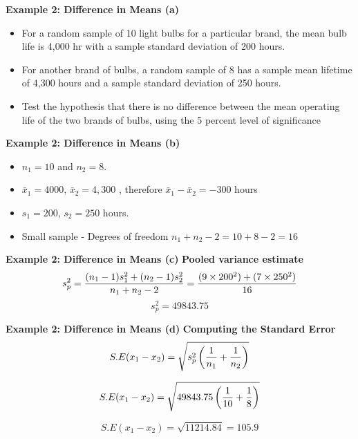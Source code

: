 \documentclass[a4]{beamer}
\begin{document}

\noindent \textbf{Example 2: Difference in Means (a) }
\begin{itemize}
\item For a random sample of 10 light bulbs for a particular brand, the mean bulb life is 4,000 hr with a sample standard deviation of 200 hours.
\item For another brand of bulbs, a random sample of 8 has a sample mean lifetime of 4,300 hours
and a sample standard deviation of 250 hours. \item Test the hypothesis that there is no difference between the
mean operating life of the two brands of bulbs, using the 5 percent level of significance
\end{itemize}




\noindent \textbf{Example 2: Difference in Means (b) }
\begin{itemize}\item $n_1 = 10$ and $n_2 = 8$.
\item $\bar{x}_1 = 4000$, $\bar{x}_2 = 4,300 $ , therefore  $\bar{x}_1 - \bar{x}_2 = -300$ hours
\item $s_1  = 200$, $s_2 = 250$ hours.
\item Small sample - Degrees of freedom $n_1 + n_2 - 2 = 10 + 8 - 2 = 16$
\end{itemize}

\noindent \textbf{Example 2: Difference in Means (c) }
\textbf{Pooled variance estimate}
\[ s^2_p = {(n_1 - 1)s^2_1  + (n_2 - 1)s^2_ 2\over n_1 + n_2 - 2 } = {(9 \times 200^2 ) +( 7 \times 250^2) \over 16 }  \]
\[ s^2_p  = 49843.75 \]



\noindent \textbf{Example 2: Difference in Means (d) }
\textbf{Computing the Standard Error}
\[ S.E(x_1 - x_2) = \sqrt{s^2_p \left({1\over n_1}+{1\over n_2} \right)}\]

\[ S.E(x_1 - x_2) = \sqrt{49843.75 \left({1\over 10}+{1\over 8} \right)}\]

\[ S.E(x_1 - x_2) = \sqrt{11214.84} = 105.9\]
\end{document}
